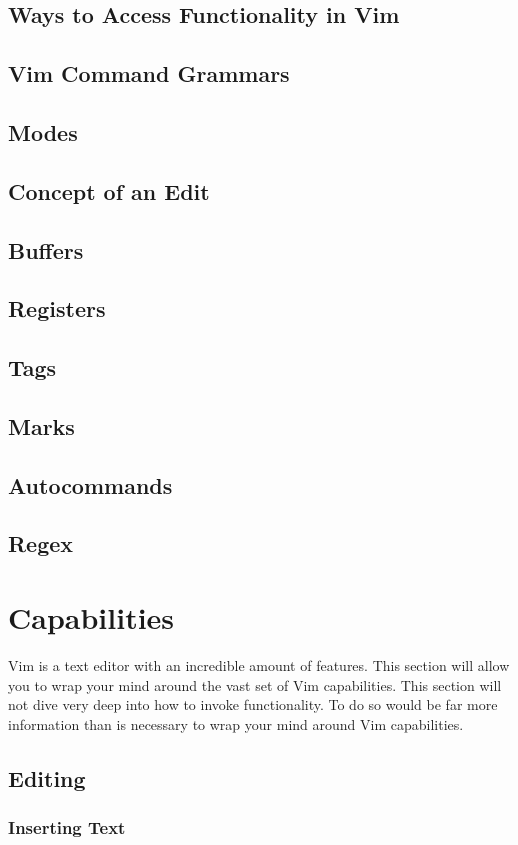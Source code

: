 \documentclass[12pt, oneside]{book}
\begin{document}
\section{Ways to Access Functionality in Vim}
\section{Vim Command Grammars}
\section{Modes}
\section{Concept of an Edit}
\section{Buffers}
\section{Registers}
\section{Tags}
\section{Marks}
\section{Autocommands}
\section{Regex}

\chapter{Capabilities}
Vim is a text editor with an incredible amount of features.  This section will allow you to wrap your mind around the vast set of Vim capabilities.  This section will not dive very deep into how to invoke
functionality.  To do so would be far more information than is necessary to wrap your mind around Vim capabilities.
\section{Editing}
  \subsection{Inserting Text}
\end{document}
